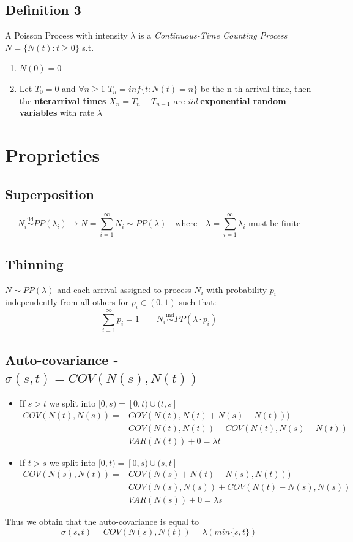 \subsection{Definition 3}
A Poisson Process with intensity $\lambda$ is a \textit{Continuous-Time Counting Process} $N=\{N(t): t \geq 0\}$ s.t.
\begin{enumerate}
    \item $N(0) = 0$
    \item Let $T_0 = 0$ and $\forall n \geq 1$ $T_n = inf\{t:N(t) = n\}$ be the n-th arrival time, then the \textbf{nterarrival times} $X_n = T_n - T_{n-1}$ are \textit{iid} \textbf{exponential random variables} with rate $\lambda$
\end{enumerate}

\section{Proprieties}
\subsection{Superposition}
$$N_i \stackrel{\text{iid}}{\sim} PP(\lambda_i) \rightarrow N = \sum_{i=1}^\infty N_i \sim PP(\lambda) \quad \text{where} \quad \lambda = \sum_{i=1}^\infty \lambda_i \text{ must be finite}$$

\subsection{Thinning}
$N \sim PP(\lambda)$ and each arrival assigned to process $N_i$ with probability $p_i$ independently from all others for $p_i \in (0,1)$ such that:
$$\sum_{i=1}^\infty p_i = 1 \quad \quad N_i \stackrel{\text{ind}}{\sim} PP(\lambda \cdot p_i)$$

\subsection{Auto-covariance - $\sigma(s,t) = COV(N(s), N(t))$}
\begin{itemize}
    \item If $s > t$ we split into $[0,s) = [0,t) \cup (t,s]$
    \begin{align*}
    COV(N(t), N(s)) = & COV(N(t), N(t) + N(s) - N(t)))\\
    & COV(N(t),N(t)) + COV(N(t), N(s) - N(t))\\
    & VAR(N(t)) + 0 = \lambda t
    \end{align*}
    \item If $t > s$ we split into $[0,t) = [0,s) \cup (s,t]$
    \begin{align*}
    COV(N(s), N(t)) = & COV(N(s) + N(t) - N(s), N(t)))\\
    & COV(N(s),N(s)) + COV(N(t) - N(s), N(s))\\
    & VAR(N(s)) + 0 = \lambda s
    \end{align*}
\end{itemize}
Thus we obtain that the auto-covariance is equal to 
$$\sigma(s,t) = COV(N(s), N(t)) = \lambda(min\{s,t\})$$

